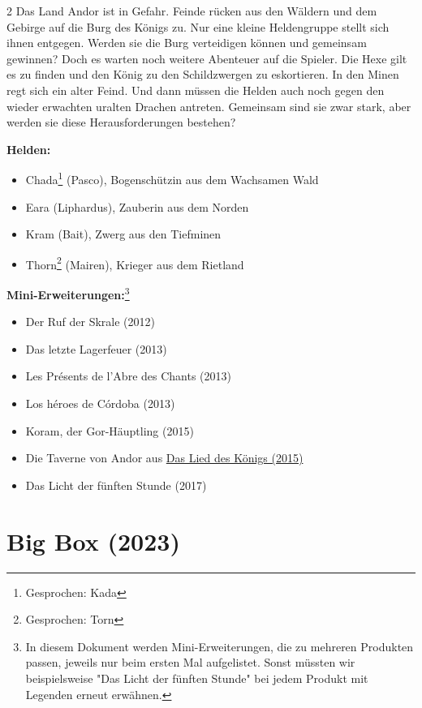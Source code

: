 \documentclass[10pt, a4paper, oneside]{book}
\newcommand{\produkt}[2][]{%
        \section{#2}%
        \label{produkt-#1}%
    }
\newcommand{\fillbreak}{\vspace*{\fill}\columnbreak}
\begin{document}
\begin{multicols}{2}
Das Land Andor ist in Gefahr. Feinde rücken aus den Wäldern und dem Gebirge auf die Burg des Königs zu. Nur eine kleine Heldengruppe stellt sich ihnen entgegen. Werden sie die Burg verteidigen können und gemeinsam gewinnen? Doch es warten noch weitere Abenteuer auf die Spieler. Die Hexe gilt es zu finden und den König zu den Schildzwergen zu eskortieren.
In den Minen regt sich ein alter Feind. Und dann müssen die Helden auch noch gegen den wieder erwachten uralten Drachen antreten. Gemeinsam sind sie zwar stark, aber werden sie diese Herausforderungen bestehen?\bigskip

\textbf{Helden:}

\begin{itemize}[topsep=0pt,itemsep=-1ex,partopsep=1ex,parsep=1ex]
    \item Chada\footnote{Gesprochen: Kada} (Pasco), Bogenschützin aus dem Wachsamen Wald
    \item Eara (Liphardus), Zauberin aus dem Norden
    \item Kram (Bait), Zwerg aus den Tiefminen
    \item Thorn\footnote{Gesprochen: Torn} (Mairen), Krieger aus dem Rietland
\end{itemize}

\textbf{Mini-Erweiterungen:}\footnote{In diesem Dokument werden Mini-Erweiterungen, die zu mehreren Produkten passen, jeweils nur beim ersten Mal aufgelistet. Sonst müssten wir beispielsweise "Das Licht der fünften Stunde" bei jedem Produkt mit Legenden erneut erwähnen.}

\begin{itemize}[topsep=0pt,itemsep=-1ex,partopsep=1ex,parsep=1ex]
    \item Der Ruf der Skrale (2012)
    \item Das letzte Lagerfeuer (2013)
    \item Les Présents de l'Abre des Chants (2013)
    \item Los héroes de Córdoba (2013)
    \item Koram, der Gor-Häuptling (2015)
    \item Die Taverne von Andor aus \hyperref[produkt-2015-das-lied-des-koenigs]{Das Lied des Königs (2015)}
    \item Das Licht der fünften Stunde (2017)
\end{itemize}




\fillbreak
\produkt[2023-big-box]{Big Box (2023)}




\end{multicols}
\end{document}
